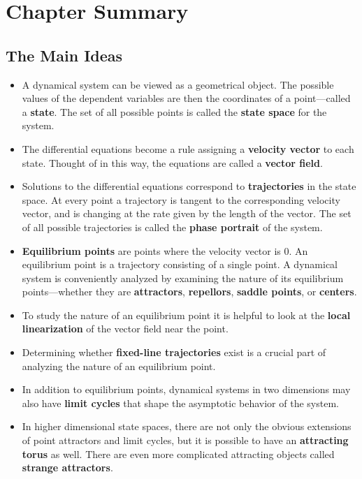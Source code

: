 \section{Chapter Summary}
\label{sec:chapter-summary}

\subsection{The Main Ideas}
\label{subsec:the-main-ideas}

\begin{itemize}

\item A dynamical system can be viewed as a geometrical object. The
  possible values of the dependent variables are then the coordinates
  of a point---called a {\bf state}.  The set of all possible points
  is called the {\bf state space} for the system.

\item The differential equations become a rule assigning a {\bf
  velocity vector} to each state.  Thought of in this way, the
  equations are called a {\bf vector field}.

\item Solutions to the differential equations correspond to {\bf
  trajectories} in the state space.  At every point a trajectory is
  tangent to the corresponding velocity vector, and is changing at the
  rate given by the length of the vector.  The set of all possible
  trajectories is called the {\bf phase portrait} of the system.

\item {\bf Equilibrium points} are points where the velocity vector is
  0. An equilibrium point is a trajectory consisting of a single
  point.  A dynamical system is conveniently analyzed by examining the
  nature of its equilibrium points---whether they are {\bf
    attractors}, {\bf repellors}, {\bf saddle points}, or {\bf
    centers}.

\item To study the nature of an equilibrium point it is helpful to
  look at the {\bf local linearization} of the vector field near the
  point.

\item Determining whether {\bf fixed-line trajectories} exist is a
  crucial part of analyzing the nature of an equilibrium point.

\item In addition to equilibrium points, dynamical systems in two
  dimensions may also have {\bf limit cycles} that shape the
  asymptotic behavior of the system.

\item In higher dimensional state spaces, there are not only the
  obvious extensions of point attractors and limit cycles, but it is
  possible to have an {\bf attracting torus} as well.  There are even
  more complicated attracting objects called {\bf strange attractors}.

\end{itemize}

